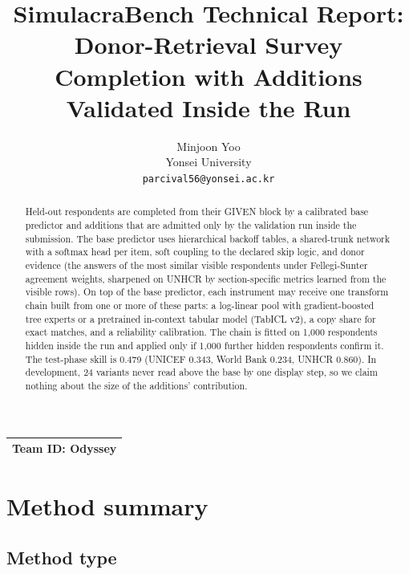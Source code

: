 \documentclass{article}
\title{SimulacraBench Technical Report:\\ Donor-Retrieval Survey Completion with Additions Validated Inside the Run}
\author{%
  Minjoon Yoo\\
  Yonsei University\\
  \texttt{parcival56@yonsei.ac.kr}
}
\newcommand{\teamid}{Odyssey}
\begin{document}
\maketitle

\begin{center}
\begin{tabular}{l}
\toprule
\textbf{Team ID:} \teamid \\
\bottomrule
\end{tabular}
\end{center}

\begin{abstract}
  Held-out respondents are completed from their GIVEN block by a calibrated base predictor and additions that are admitted only by the validation run inside the submission. The base predictor uses hierarchical backoff tables, a shared-trunk network with a softmax head per item, soft coupling to the declared skip logic, and donor evidence (the answers of the most similar visible respondents under Fellegi-Sunter agreement weights, sharpened on UNHCR by section-specific metrics learned from the visible rows). On top of the base predictor, each instrument may receive one transform chain built from one or more of these parts: a log-linear pool with gradient-boosted tree experts or a pretrained in-context tabular model (TabICL v2), a copy share for exact matches, and a reliability calibration. The chain is fitted on 1,000 respondents hidden inside the run and applied only if 1,000 further hidden respondents confirm it. The test-phase skill is 0.479 (UNICEF 0.343, World Bank 0.234, UNHCR 0.860). In development, 24 variants never read above the base by one display step, so we claim nothing about the size of the additions' contribution.
\end{abstract}

\section{Method summary}
\label{sec:method}

\subsection{Method type}
\end{document}
